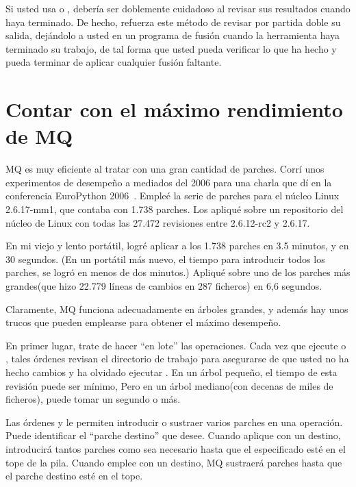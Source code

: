 Si usted usa  o , debería ser
doblemente cuidadoso al revisar sus resultados cuando haya terminado.
De hecho,  refuerza este método de revisar por partida
doble su salida, dejándolo a usted en un programa de fusión cuando la
herramienta haya terminado su trabajo, de tal forma que usted pueda
verificar lo que ha hecho y pueda terminar de aplicar cualquier fusión
faltante.

\section{Contar con el máximo rendimiento de MQ}
\label{sec:mq:perf}

MQ es muy eficiente al tratar con una gran cantidad de parches.  Corrí
unos experimentos de desempeño a mediados del 2006 para una charla que
dí en la conferencia EuroPython 2006~\cite{web:europython}.  Empleé la
serie de parches para el núcleo Linux 2.6.17-mm1, que contaba con 1.738
parches.  Los apliqué sobre un repositorio del núcleo de Linux con
todas las 27.472 revisiones entre 2.6.12-rc2 y 2.6.17.

En mi viejo y lento portátil, logré aplicar 
 a los 1.738 parches en 3.5
minutos, y  en 30 segundos.
(En un portátil más nuevo, el tiempo para introducir todos los
parches, se logró en menos de dos minutos.)  Apliqué
 sobre uno de los parches más grandes(que hizo
22.779 líneas de cambios en 287 ficheros) en 6,6 segundos.

Claramente, MQ funciona adecuadamente en árboles grandes, y además hay
unos trucos que pueden emplearse para obtener el máximo desempeño.

En primer lugar, trate de hacer ``en lote'' las operaciones.  Cada vez
que ejecute  o , tales órdenes
revisan el directorio de trabajo para asegurarse de que usted no ha
hecho cambios y ha olvidado ejecutar .  En un
árbol pequeño, el tiempo de esta revisión puede ser mínimo,  Pero en
un árbol mediano(con decenas de miles de ficheros), puede tomar un
segundo o más.

Las órdenes  y  le permiten
introducir o sustraer varios parches en una operación.  Puede
identificar el ``parche destino'' que desee.  Cuando aplique
 con un destino, introducirá tantos parches como sea
necesario hasta que el especificado esté en el tope de la pila.
Cuando emplee  con un destino, MQ sustraerá parches
hasta que el parche destino esté en el tope.

